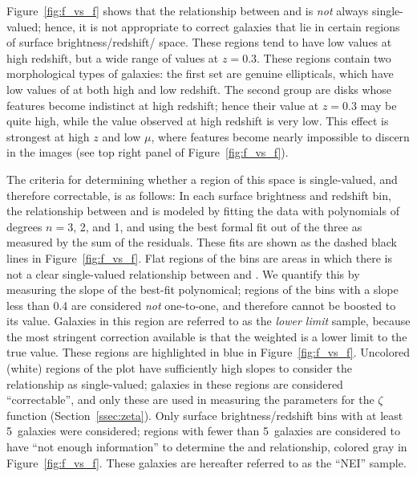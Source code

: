 \documentclass[twocolumn]{aastex6}
\begin{document}
Figure~\ref{fig:f_vs_f} shows that the relationship between \ffeaturesz{} and
\ffeaturesrest{} is \emph{not} always single-valued; hence, it is not
appropriate to correct galaxies that lie in certain regions of surface
brightness/redshift/\ffeatures{} space. These regions tend to have low
\ffeatures{} values at high redshift, but a wide range of values at $z=0.3$.
These regions contain two morphological types of galaxies: the first set are
genuine ellipticals, which have low values of \ffeatures{} at both high and low
redshift. The second group are disks whose features become indistinct at high
redshift; hence their \ffeatures{} value at $z=0.3$ may be quite high, while
the value observed at high redshift is very low. This effect is strongest at
high $z$ and low $\mu$, where features become nearly impossible to discern in
the images (see top right panel of Figure~\ref{fig:f_vs_f}).

The criteria for determining whether a region of this space is single-valued,
and therefore correctable, is as follows: In each surface brightness and
redshift bin, the relationship between \ffeaturesz{} and \ffeaturesrest{} is
modeled by fitting the data with polynomials of degrees $n=3$, 2, and 1, and
using the best formal fit out of the three as measured by the sum of the
residuals. These fits are shown as the dashed black lines in
Figure~\ref{fig:f_vs_f}. Flat regions of the bins are areas in which there is
not a clear single-valued relationship between \ffeaturesz{} and
\ffeaturesrest. We quantify this by measuring the slope of the best-fit
polynomical; regions of the bins with a slope less than 0.4 are considered
\emph{not} one-to-one, and therefore \ffeaturesz{} cannot be boosted to its
\ffeaturesrest{} value.  Galaxies in this region are referred to as the
\emph{lower limit} sample, because the most stringent correction available is
that the weighted \ffeatures{} is a lower limit to the true value.  These
regions are highlighted in blue in Figure~\ref{fig:f_vs_f}. Uncolored (white)
regions of the plot have sufficiently high slopes to consider the relationship
as single-valued; galaxies in these regions are considered ``correctable'', and
only these are used in measuring the parameters for the $\zeta$ function
(Section~\ref{ssec:zeta}). Only surface brightness/redshift bins with at least
5~galaxies were considered; regions with fewer than 5~galaxies are considered
to have ``not enough information'' to determine the \ffeaturesz{} and
\ffeaturesrest{} relationship, colored gray in Figure~\ref{fig:f_vs_f}. These
galaxies are hereafter referred to as the ``NEI'' sample.
\end{document}
